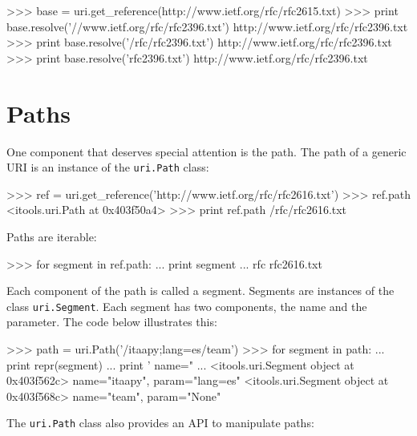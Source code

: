 \begin{code}
    >>> base = uri.get_reference(http://www.ietf.org/rfc/rfc2615.txt)
    >>> print base.resolve('//www.ietf.org/rfc/rfc2396.txt')
    http://www.ietf.org/rfc/rfc2396.txt
    >>> print base.resolve('/rfc/rfc2396.txt')
    http://www.ietf.org/rfc/rfc2396.txt
    >>> print base.resolve('rfc2396.txt')
    http://www.ietf.org/rfc/rfc2396.txt
\end{code}


\section{Paths}

One component that deserves special attention is the path. The path of a
generic URI is an instance of the {\tt uri.Path} class:

\begin{code}
    >>> ref = uri.get_reference('http://www.ietf.org/rfc/rfc2616.txt')
    >>> ref.path
    <itools.uri.Path at 0x403f50a4>
    >>> print ref.path
    /rfc/rfc2616.txt
\end{code}

Paths are iterable:

\begin{code}
    >>> for segment in ref.path:
    ...     print segment
    ... 
    rfc
    rfc2616.txt
\end{code}

Each component of the path is called a segment. Segments are instances of
the class {\tt uri.Segment}. Each segment has two components, the name and
the parameter. The code below illustrates this:

\begin{code}
    >>> path = uri.Path('/itaapy;lang=es/team')
    >>> for segment in path:
    ...     print repr(segment)
    ...     print '  name="%
    ... 
    <itools.uri.Segment object at 0x403f562c>
      name="itaapy", param="lang=es"
    <itools.uri.Segment object at 0x403f568c>
      name="team", param="None"
\end{code}

The {\tt uri.Path} class also provides an API to manipulate paths:


